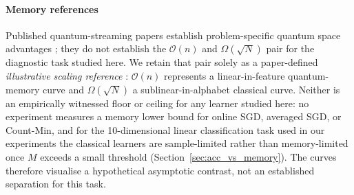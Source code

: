 \documentclass[sensors,article,submit,pdftex,moreauthors]{Definitions/mdpi}
\newcommand{\bigO}{\mathcal{O}}
\providecommand{\DIFadd}[1]{{\protect\color{blue}#1}} %
\providecommand{\DIFdel}[1]{} %
\providecommand{\DIFaddbegin}{} %
\providecommand{\DIFaddend}{} %
\providecommand{\DIFdelbegin}{} %
\providecommand{\DIFdelend}{} %
\begin{document}
\DIFdelbegin \DIFdel{For the quantum memory requirement, the exact framework establishes that }\DIFdelend \DIFaddbegin \paragraph{\DIFadd{Memory references}} \DIFadd{Published quantum-streaming papers establish problem-specific quantum space advantages }\citep{kallaugher2021streaming, kallaugher2024maxdicut}\DIFadd{; they do not establish the }\DIFaddend $\bigO(n)$ \DIFdelbegin \DIFdel{qubits suffice for oracle construction. On the classical side, it establishes task-specific hardness results in which classical machines of size $\bigO(N^{c})$, for any constant $c < 1$, cannot match the quantum performance. Throughout this paper we use $\Omega(\sqrt{N})$ as a }\DIFdelend \DIFaddbegin \DIFadd{and $\Omega(\sqrt{N})$ pair for the diagnostic task studied here. We retain that pair solely as a paper-defined }\DIFaddend \emph{\DIFdelbegin \DIFdel{conservative representative}\DIFdelend \DIFaddbegin \DIFadd{illustrative scaling reference}\DIFaddend }\DIFdelbegin \DIFdel{of this polynomial-in-$N$ family, in the spirit of classical streaming space bounds }%
\DIFdel{; it is }\emph{\DIFdel{not}} %
\DIFdelend \DIFaddbegin \DIFadd{: $\bigO(n)$ represents a linear-in-feature quantum-memory curve and $\Omega(\sqrt{N})$ a sublinear-in-alphabet classical curve. Neither is }\DIFaddend an empirically witnessed floor \DIFdelbegin \DIFdel{for }\DIFdelend \DIFaddbegin \DIFadd{or ceiling for any learner studied here: no experiment measures a memory lower bound for online SGD, averaged SGD, or Count-Min, and for }\DIFaddend the \DIFdelbegin \DIFdel{online-gradient classical learners studied here. For the }\DIFdelend 10-dimensional linear classification task used in our experiments \DIFdelbegin \DIFdel{, the classical learner is in fact }\DIFdelend \DIFaddbegin \DIFadd{the classical learners are }\DIFaddend sample-limited rather than memory-limited once $M$ exceeds a small threshold (Section~\ref{sec:acc_vs_memory}). The \DIFdelbegin \DIFdel{$\Omega(\sqrt{N})$ curve in our figures therefore illustrates the worst-case asymptotic separation, not the empirical gap on the specific taskstudied}\DIFdelend \DIFaddbegin \DIFadd{curves therefore visualise a hypothetical asymptotic contrast, not an established separation for this task}\DIFaddend .
\end{document}
